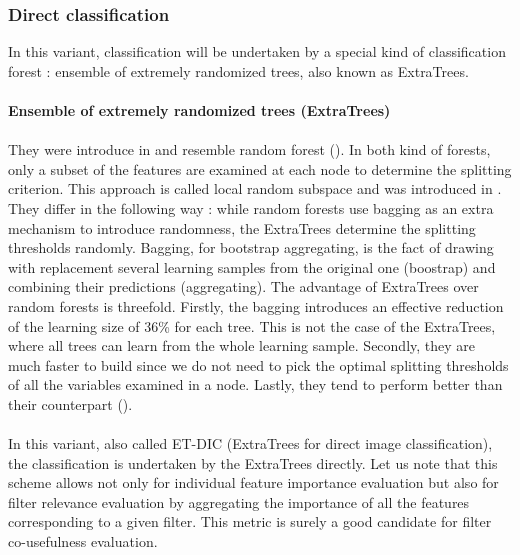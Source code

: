 \documentclass[a4paper]{report}
\begin{document}
			\subsubsection{Direct classification}
			In this variant, classification will be undertaken by a special kind of classification forest : ensemble of extremely randomized trees, also known as ExtraTrees.
			\begin{leftbar}
				\paragraph{Ensemble of extremely randomized trees (ExtraTrees)}
				\paragraph{}
				They were introduce in \cite{extratrees} and resemble random forest (\cite{randomforests}). In both kind of forests, only a subset of the features are examined at each node to determine the splitting criterion. This approach is called local random subspace and was introduced in \cite{randomsubspace}. They differ in the following way : while random forests use bagging as an extra mechanism to introduce randomness, the ExtraTrees determine the splitting thresholds randomly. Bagging, for bootstrap aggregating, is the fact of drawing with replacement several learning samples from the original one (boostrap) and combining their predictions (aggregating). 
						The advantage of ExtraTrees over random forests is threefold. Firstly, the bagging introduces an effective reduction of the learning size of 36\% for each tree. This is not the case of the ExtraTrees, where all trees can learn from the whole learning sample. Secondly, they are much faster to build since we do not need to pick the optimal splitting thresholds of all the variables examined in a node. Lastly, they tend to perform better than their counterpart (\cite{extratrees}).
			\end{leftbar}
			\paragraph{}
			In this variant, also called ET-DIC (ExtraTrees for direct image classification), the classification is undertaken by the ExtraTrees directly.
			Let us note that this scheme allows not only for individual feature importance evaluation but also for filter relevance evaluation by aggregating the importance of all the features corresponding to a given filter. This metric is surely a good candidate for filter co-usefulness evaluation.
			
\end{document}
